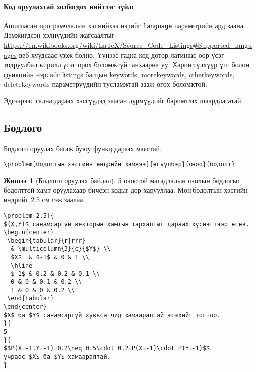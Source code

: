 \documentclass[10pt]{article}
\theoremstyle{definition}
\newtheorem{example}{Жишээ}
\begin{document}
\paragraph{Код оруулахтай холбогдох нийтлэг зүйлс} Ашигласан програмчлалын хэлнийхээ нэрийг \texttt{language} параметрийн ард заана. Дэмжигдсэн хэлнүүдийн жагсаалтыг \url{https://en.wikibooks.org/wiki/LaTeX/Source_Code_Listings#Supported_languages} веб хуудсаас үзэж болно. Үүнээс гадна код дотор латинаас өөр үсэг тодруулбал кирилл үсэг орох боломжгүйг анхаарна уу. Харин түлхүүр үгс болон функцийн нэрсийг listings багцын keywords, morekeywords, otherkeywords, deletekeywords параметрүүдийн тусламжтай зааж өгөх боломжтой.

\vspace{\baselineskip}

\par\noindent Эдгээрээс гадна дараах хэсгүүдэд заасан дүрмүүдийг баримтлах шаардлагатай.

\subsection{Бодлого}

Бодлого оруулах багаж буюу функц дараах маягтай.
\begin{verbatim}
\problem[бодолтын хэсгийн өндрийн хэмжээ]{өгүүлбэр}{оноо}{бодолт}
\end{verbatim}

\begin{example}[Бодлого оруулах байдал]
5 оноотой магадлалын онолын бодлогыг бодолттой хамт оруулахаар бичсэн кодыг дор харууллаа. Мөн бодолтын хэсгийн өндрийг 2.5 см гэж заалаа.
\begin{verbatim}
\problem[2.5]{
$(X,Y)$ санамсаргүй векторын хамтын тархалтыг дараах хүснэгтээр өгөв.
\begin{center}
 \begin{tabular}{r|rrr}
  & \multicolumn{3}{c}{$Y$} \\
  $X$  & $-1$ & 0 & 1 \\
  \hline
  $-1$ & 0.2 & 0.2 & 0.1 \\
  0 & 0 & 0.1 & 0.2 \\
  1 & 0 & 0 & 0.2 \\
 \end{tabular}
\end{center}
$X$ ба $Y$ санамсаргүй хувьсагчид хамааралтай эсэхийг тогтоо.
}{
5
}{
$$P(X=-1,Y=-1)=0.2\neq 0.5\cdot 0.2=P(X=-1)\cdot P(Y=-1)$$
учраас $X$ ба $Y$ хамааралтай.
}
\end{verbatim}
\end{example}
\end{document}
